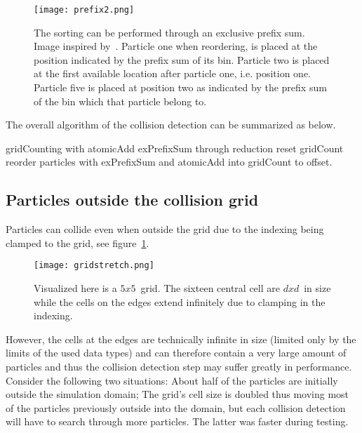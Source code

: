 \begin{figure}[H]
  \centering
  \texttt{[image: prefix2.png]}
  \caption{The sorting can be performed through an exclusive prefix sum. Image inspired by~\cite{fastnearest}.
  Particle one when reordering, is placed at the position indicated by the prefix sum of its bin. Particle two is placed at the first available location after particle one, i.e. position one.
  Particle five is placed at position two as indicated by the prefix sum of the bin which that particle belong to.}
\end{figure}

The overall algorithm of the collision detection can be summarized as below.

\begin{algorithm}[H]
  \begin{algorithmic}[1]
  \State gridCounting with atomicAdd
  \State exPrefixSum through reduction
  \State reset gridCount
  \State reorder particles with exPrefixSum and atomicAdd into gridCount to offset.
  \end{algorithmic}
\end{algorithm}

\subsection{Particles outside the collision grid}
Particles can collide even when outside the grid due to the indexing
being clamped to the grid, see figure~\ref{fig:gridStretch}.

\begin{figure}[H]
  \centering
  \texttt{[image: gridstretch.png]}
  \caption{Visualized here is a $5x5$ grid. The sixteen central cell are $dxd$ in size while the cells on the edges extend infinitely due to clamping in the indexing.\label{fig:gridStretch}}
\end{figure}

However, the cells at the edges are technically infinite
in size (limited only by the limits of the used data types) and can therefore contain a very large amount of particles and thus the collision
detection step may suffer greatly in performance. Consider the following two situations:
About half of the particles are initially outside the simulation domain; The grid's
cell size is doubled thus moving most of the particles previously outside into the domain, but
each collision detection will have to search through more particles.
The latter was faster during testing.

